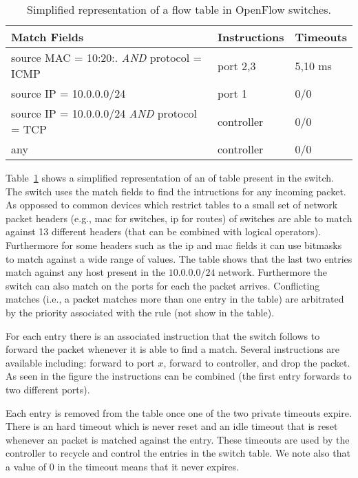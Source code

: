 \begin{table}[ht]
  \centering
  \begin{tabular}[ht]{lll}
    Match Fields &  Instructions & Timeouts \\ \toprule 
    source MAC = 10:20:. \emph{AND}  protocol = ICMP  & port 2,3 & 5,10 ms \\ 
    source IP = 10.0.0.0/24  & port 1 &  0/0 \\
    source IP = 10.0.0.0/24 \emph{AND} protocol = TCP & controller & 0/0 \\ 
    any & controller & 0/0 \\ \bottomrule 
  \end{tabular}
  \caption[Openflow Flow Table]{Simplified representation of a flow table in OpenFlow switches.}
  \label{tab:related:openflow-flows}
\end{table}

Table~\ref{tab:related:openflow-flows} shows a simplified representation of an \gls{of} table present in the switch. 
The switch uses the match fields to find the intructions for any incoming packet. As oppossed to common devices which restrict tables to a small set of network packet headers (e.g., \gls{mac} for switches, \gls{ip} for routes) \gls{of} switches are able to match against 13 different headers (that can be combined with logical operators). Furthermore for some headers such as the \gls{ip} and \gls{mac} fields it can use bitmasks to match against a wide range of values. The table shows that the last two entries match against any host present in the $10.0.0.0/24$ network. Furthermore the switch can also match on the ports for each the packet arrives. Conflicting matches (i.e., a packet matches more than one entry in the table) are arbitrated by the priority associated with the rule (not show in the table). 

For each entry there is an associated instruction that the switch follows to forward the packet whenever it is able to find a match. Several instructions are available including: forward to port $x$, forward to controller, and drop the packet. As seen in the figure the instructions can be combined (the first entry forwards to two different ports). 

Each entry is removed from the table once one of the two private timeouts expire. There is an hard timeout which is never reset and an  idle timeout that is reset whenever an packet is matched against the entry. These timeouts are used by the controller to recycle and control the entries in the switch table. We note also that a value of 0  in the timeout means that it never expires. 

